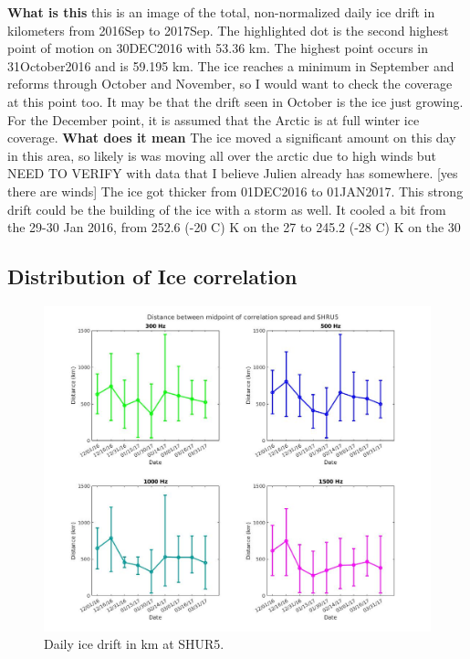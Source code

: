 \textbf{What is this}
this is an image of the total, non-normalized daily ice drift in kilometers from 2016Sep to 2017Sep. The highlighted dot is the second highest point of motion on 30DEC2016 with 53.36 km. The highest point occurs in 31October2016 and is 59.195 km. The ice reaches a minimum in September and reforms through October and November, so I would want to check the coverage at this point too. It may be that the drift seen in October is the ice just growing. For the December point, it is assumed that the Arctic is at full winter ice coverage. 
\textbf{What does it mean}
The ice moved a significant amount on this day in this area, so likely is was moving all over the arctic due to high winds but NEED TO VERIFY with data that I believe Julien already has somewhere. [yes there are winds] The ice got thicker from 01DEC2016 to 01JAN2017. This strong drift could be the building of the ice with a storm as well.
It cooled a bit from the 29-30 Jan 2016, from 252.6 (-20 C) K on the 27 to 245.2 (-28 C) K on the 30


\subsection{Distribution of Ice correlation}

\begin{figure}[h]
\centering
\includegraphics[scale=0.4]{Figures/errorbars_tiled.jpg}
\caption{Daily ice drift in km at SHUR5.}
\label{fig_totalice}
\end{figure}
